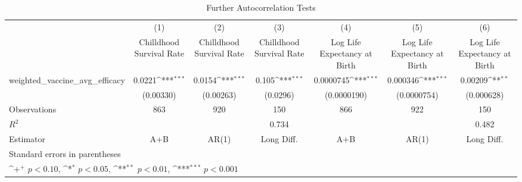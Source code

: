 \begin{table}[htbp]\centering
\def\sym#1{\ifmmode^{#1}\else\(^{#1}\)\fi}
\caption{Further Autocorrelation Tests}
\begin{tabular}{l*{6}{c}}
\toprule
                &\multicolumn{1}{c}{(1)}&\multicolumn{1}{c}{(2)}&\multicolumn{1}{c}{(3)}&\multicolumn{1}{c}{(4)}&\multicolumn{1}{c}{(5)}&\multicolumn{1}{c}{(6)}\\
                &\multicolumn{1}{c}{Chilldhood Survival Rate}&\multicolumn{1}{c}{Chilldhood Survival Rate}&\multicolumn{1}{c}{Chilldhood Survival Rate}&\multicolumn{1}{c}{Log Life Expectancy at Birth}&\multicolumn{1}{c}{Log Life Expectancy at Birth}&\multicolumn{1}{c}{Log Life Expectancy at Birth}\\
\midrule
weighted\_vaccine\_avg\_efficacy&   0.0221\sym{***}&   0.0154\sym{***}&    0.105\sym{***}&0.0000745\sym{***}& 0.000346\sym{***}&  0.00209\sym{**} \\
                &(0.00330)         &(0.00263)         & (0.0296)         &(0.0000190)         &(0.0000754)         &(0.000628)         \\
\midrule
Observations    &      863         &      920         &      150         &      866         &      922         &      150         \\
\(R^{2}\)       &                  &                  &    0.734         &                  &                  &    0.482         \\
Estimator       &      A+B         &    AR(1)         &Long Diff.         &      A+B         &    AR(1)         &Long Diff.         \\
\bottomrule
\multicolumn{7}{l}{\footnotesize Standard errors in parentheses}\\
\multicolumn{7}{l}{\footnotesize \sym{+} \(p<0.10\), \sym{*} \(p<0.05\), \sym{**} \(p<0.01\), \sym{***} \(p<0.001\)}\\
\end{tabular}
\end{table}
